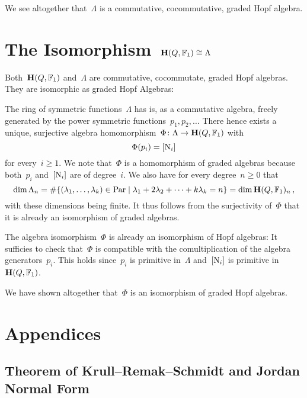 \documentclass[a4paper,11pt]{scrartcl}
\begin{document}
We see altogether that~$\Lambda$ is a commutative, cocommutative, graded Hopf algebra.





\section{The Isomorphism~$\mathbf{H}(Q, \mathbb{F}_1) \cong \Lambda$}

Both~$\mathbf{H}(Q, \mathbb{F}_1)$ and~$\Lambda$ are commutative, cocommutate, graded Hopf algebras.
They are isomorphic as graded Hopf Algebras:

The ring of symmetric functions~$\Lambda$ has is, as a commutative algebra, freely generated by the power symmetric functions~$p_1, p_2, \dotsc$
There hence exists a unique, surjective algebra homomorphism~$\Phi \colon \Lambda \to \mathbf{H}(Q, \mathbb{F}_1)$ with
\[
  \Phi(p_i) = [\mathrm{N}_i]
\]
for every~$i \geq 1$.
We note that~$\Phi$ is a homomorphism of graded algebras because both~$p_i$ and~$[ \mathrm{N}_i ]$ are of degree~$i$.
We also have for every degree~$n \geq 0$ that
\[
  \dim \Lambda_n
  =
  \counting
  \{
    (\lambda_1, \dotsc, \lambda_k) \in \Par
  \suchthat
    \lambda_1 + 2 \lambda_2 + \dotsb + k \lambda_k = n
  \}
  =
  \dim \Hall(Q, \Finite_1)_n \,,
\]
with these dimensions being finite.
It thus follows from the surjectivity of~$\Phi$ that it is already an isomorphism of graded algebras.

The algebra isomorphism~$\Phi$ is already an isomorphism of Hopf algebras:
It sufficies to check that~$\Phi$ is compatible with the comultiplication of the algebra generators~$p_i$.
This holds since~$p_i$ is primitive in~$\Lambda$ and~$[ \mathrm{N}_i ]$ is primitive in~$\mathbf{H}(Q, \mathbb{F}_1)$.

We have shown altogether that~$\Phi$ is an isomorphism of graded Hopf algebras.






\newpage
\appendix
\section{Appendices}



\subsection{Theorem of Krull--Remak--Schmidt and Jordan Normal Form}
\label{jordan normal form}
\end{document}
